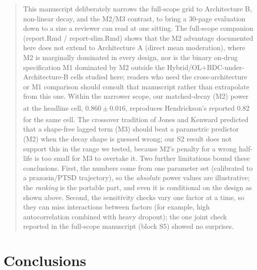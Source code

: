 \documentclass[
  11pt,
]{article}
\newenvironment{orig}{%
  \begin{quote}\normalsize\color[gray]{0.55}}{%
  \end{quote}}
\begin{document}
\begin{orig}
This manuscript deliberately narrows the full-scope grid to
Architecture B, non-linear decay, and the M2/M3 contrast, to bring a
30-page evaluation down to a size a reviewer can read at one sitting.
The full-scope companion (report.Rmd / report-slim.Rmd) shows that
the M2 advantage documented here does not extend to Architecture A
(direct mean moderation), where M2 is marginally dominated in every
design, nor is the binary on-drug specification M1 dominated by M2
outside the Hybrid/OL+BDC-under-Architecture-B cells studied here;
readers who need the cross-architecture or M1 comparison should
consult that manuscript rather than extrapolate from this one. Within
the narrower scope, our matched-decay (M2) power at the headline
cell, \(0.860 \pm 0.016\), reproduces Hendrickson's\textsuperscript{} reported 0.82 for the same cell. The crossover
tradition of Jones and Kenward\textsuperscript{} predicted that
a shape-free lagged term (M3) should beat a parametric predictor (M2)
when the decay shape is guessed wrong; our S2 result does not support
this in the range we tested, because M2's penalty for a wrong
half-life is too small for M3 to overtake it. Two further
limitations bound these conclusions. First, the numbers come from one
parameter set (calibrated to a prazosin/PTSD trajectory), so the
\emph{absolute} power values are illustrative; the \emph{ranking} is the
portable part, and even it is conditional on the design as shown
above. Second, the sensitivity checks vary one factor at a time, so
they can miss interactions between factors (for example, high
autocorrelation combined with heavy dropout); the one joint check
reported in the full-scope manuscript (block S5) showed no
surprises.

\end{orig}

\section{Conclusions}\label{conclusions}
\end{document}
